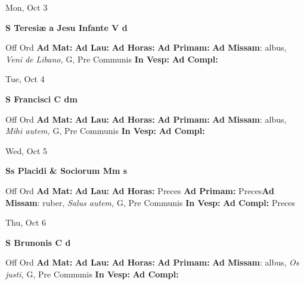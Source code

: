 \documentclass[10pt]{memoir}
\begin{document}
\begin{center}
\begin{minipage}{3.5in}
\vspace{2em}
\begin{center}Mon, Oct 3
\end{center}
\textbf{ \large S Teresiæ a Jesu Infante V
\textnormal{\normalsize d}}

\begin{justify}Off Ord
\textbf{Ad Mat: }
\textbf{Ad Lau: }
\textbf{Ad Horas: }
\textbf{Ad Primam: }\textbf{Ad Missam}: albus, \textit{Veni de Libano,} G, Pre Communis
\textbf{In Vesp: }
\textbf{Ad Compl: }
\end{justify}
\end{minipage}
\end{center}

\begin{center}
\begin{minipage}{3.5in}
\vspace{2em}
\begin{center}Tue, Oct 4
\end{center}
\textbf{ \large S Francisci C
\textnormal{\normalsize dm}}

\begin{justify}Off Ord
\textbf{Ad Mat: }
\textbf{Ad Lau: }
\textbf{Ad Horas: }
\textbf{Ad Primam: }\textbf{Ad Missam}: albus, \textit{Mihi autem,} G, Pre Communis
\textbf{In Vesp: }
\textbf{Ad Compl: }
\end{justify}
\end{minipage}
\end{center}

\begin{center}
\begin{minipage}{3.5in}
\vspace{2em}
\begin{center}Wed, Oct 5
\end{center}
\textbf{ \large Ss Placidi \& Sociorum Mm
\textnormal{\normalsize s}}

\begin{justify}Off Ord
\textbf{Ad Mat: }
\textbf{Ad Lau: }
\textbf{Ad Horas: }Preces
\textbf{Ad Primam: }Preces\textbf{Ad Missam}: ruber, \textit{Salus autem,} G, Pre Communis
\textbf{In Vesp: }
\textbf{Ad Compl: }Preces
\end{justify}
\end{minipage}
\end{center}

\begin{center}
\begin{minipage}{3.5in}
\vspace{2em}
\begin{center}Thu, Oct 6
\end{center}
\textbf{ \large S Brunonis C
\textnormal{\normalsize d}}

\begin{justify}Off Ord
\textbf{Ad Mat: }
\textbf{Ad Lau: }
\textbf{Ad Horas: }
\textbf{Ad Primam: }\textbf{Ad Missam}: albus, \textit{Os justi,} G, Pre Communis
\textbf{In Vesp: }
\textbf{Ad Compl: }
\end{justify}
\end{minipage}
\end{center}
\end{document}
